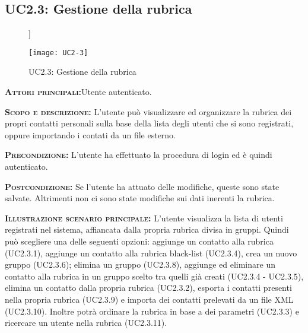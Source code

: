 \subsection{UC2.3: Gestione della rubrica}
\begin{figure}[[h!]]
\begin{center}
\texttt{[image: UC2-3]}
\caption{UC2.3: Gestione della rubrica}\label{fig:gestione_rubrica}
\end{center}
\end{figure}
\begin{description}
\item{\scshape\bfseries Attori principali:}Utente autenticato.
\item{\scshape\bfseries Scopo e descrizione:} L'utente può visualizzare ed organizzare la rubrica dei propri contatti personali sulla base della lista degli utenti che si sono registrati, oppure importando i contati da un file esterno.
\item{\scshape\bfseries Precondizione:} L'utente ha effettuato la procedura di login ed è quindi autenticato.
\item{\scshape\bfseries Postcondizione:} Se l'utente ha attuato delle modifiche, queste sono state salvate. Altrimenti non ci sono state modifiche sui dati inerenti la rubrica.
\item{\scshape\bfseries Illustrazione scenario principale:} L'utente visualizza la lista di utenti registrati nel sistema, affiancata dalla propria rubrica divisa in gruppi. Quindi può scegliere una delle seguenti opzioni: aggiunge un contatto alla rubrica (UC2.3.1), aggiunge un contatto alla rubrica black-list (UC2.3.4), crea un nuovo gruppo (UC2.3.6); elimina un gruppo (UC2.3.8), aggiunge ed eliminare un contatto alla rubrica in un gruppo scelto tra quelli già creati (UC2.3.4 - UC2.3.5), elimina un contatto dalla propria rubrica (UC2.3.2), esporta i contatti presenti nella propria rubrica (UC2.3.9) e importa dei contatti prelevati da un file XML (UC2.3.10).
Inoltre potrà ordinare la rubrica in base a dei parametri (UC2.3.3) e ricercare un utente nella rubrica (UC2.3.11).
\end{description}

